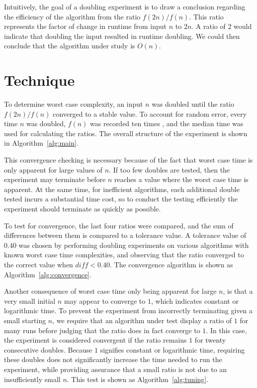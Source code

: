 \documentclass{sig-alternate}
\begin{document}
Intuitively, the goal of a doubling experiment is to draw a conclusion
regarding the efficiency of the algorithm from the ratio
$f(2n)/f(n)$. This ratio represents the factor of change in runtime from
input $n$ to $2n$. A ratio of $2$ would indicate that doubling the
input resulted in runtime doubling. We could then conclude that the
algorithm under study is $O(n)$. 

\section{Technique}
To determine worst case complexity, an input $n$ was doubled until the 
ratio $f(2n) / f(n)$ converged to a stable value. To account for random
error, every time $n$ was doubled, $f(n)$ was recorded ten times
, and the median time was used for calculating the ratios. The overall 
structure of the experiment is shown in Algorithm~\ref{alg:main}.

This convergence checking is necessary because of the fact that worst
case time is only apparent for large values of $n$. If too few doubles
are tested, then the experiment may terminate before $n$ reaches a value
where the worst case time is apparent. At the same time, for inefficient 
algorithms, each additional double tested incurs a substantial time cost, 
so to conduct the testing efficiently the experiment should terminate as 
quickly as possible.

To test for convergence, the last four ratios were compared, and the
sum of differences between them is compared to a tolerance value. A
tolerance value of $0.40$ was chosen 
by performing doubling experiments on various algorithms with known worst case time
complexities, and observing that the ratio converged to the correct
value when $\mathit{diff} < 0.40$. The convergence algorithm is shown
as Algorithm~\ref{alg:convergence}.
  
Another consequence of worst case time only being apparent for large
$n$, is that a very small initial $n$ may appear to converge to $1$,
which indicates constant or logarithmic time. To prevent the
experiment from incorrectly terminating given a small starting $n$, we
require that an algorithm under test display a ratio of $1$ for many
runs before judging that the ratio does in fact converge to $1$. In this case,
the experiment is considered convergent if the ratio remains $1$ for 
twenty consecutive doubles.  Because $1$ signifies constant or logarithmic 
time, requiring these doubles does not significantly increase the time needed
to run the experiment, while providing assurance that a small ratio is not due to
an insufficiently small $n$. This test is shown as Algorithm~\ref{alg:tuning}.
\end{document}
